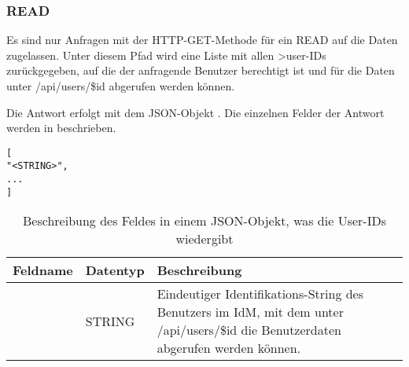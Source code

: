 \subsubsection{READ}
\label{sec:rest:api:users:read}
Es sind nur Anfragen mit der HTTP-GET-Methode für ein READ auf die Daten zugelassen.
Unter diesem Pfad wird eine Liste mit allen >user-IDs zurückgegeben, auf die der anfragende Benutzer berechtigt ist und für die Daten unter /api/users/\$id abgerufen werden können.

Die Antwort erfolgt mit dem JSON-Objekt . 
Die einzelnen Felder der Antwort werden in  beschrieben.

\begin{lstlisting}[caption={JSON-Antwort für einen GET-Aufruf des Pfads /api/users},label={lst:code:rest:api:users:read:ret},frame=tlrb]
[
"<STRING>",
...
]
\end{lstlisting}

\begin{longtable}{|p{}|p{}|p{}|}
		\caption{Beschreibung des Feldes in einem JSON-Objekt, was die User-IDs wiedergibt}
\endfoot
		\caption{Beschreibung des Feldes in einem JSON-Objekt, was die User-IDs wiedergibt}
		\label{tab:rest:api:users:read:ret}
\endlastfoot 
\hline
			\textbf{Feldname} & \textbf{Datentyp} & \textbf{Beschreibung} \\ \hline
\endhead
 & STRING & Eindeutiger Identifikations-String des Benutzers im IdM, mit dem unter /api/users/\$id die Benutzerdaten abgerufen werden können.\\ \hline
\end{longtable}